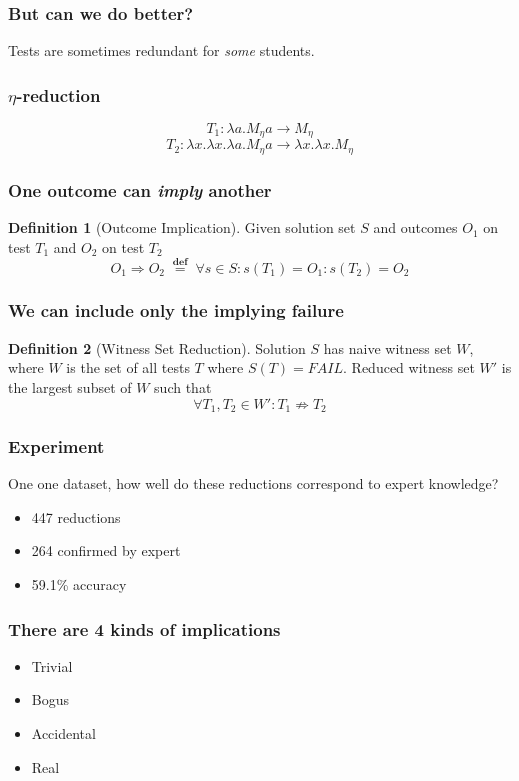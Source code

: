 \documentclass[svgnames,14pt]{beamer}
\newcommand\fail{\mathit{FAIL}}
\newcommand\defined{\mathrel{\;\stackrel{\scriptscriptstyle\mathbf{def}}{=}\;}}
\theoremstyle{definition}
\newtheorem{defn}{Definition}
\begin{document}
\begin{frame}
\frametitle{But can we do better?}
Tests are sometimes redundant for \emph{some} students.
\end{frame}

\begin{frame}
\frametitle{$\eta$-reduction}
$$T_1 : \lambda a.M_\eta a \longrightarrow M_\eta$$
$$T_2 : \lambda x.\lambda x.\lambda a.M_\eta a \longrightarrow \lambda x.\lambda x.M_\eta$$
\end{frame}

\begin{frame}
\frametitle{One outcome can \emph{imply} another}
\begin{defn}[Outcome Implication]
Given solution set $S$ and outcomes $O_1$ on test $T_1$ and $O_2$ on test $T_2$
$$O_1 \Rightarrow O_2 \defined \forall s \in S : s(T_1) = O_1 : s(T_2) = O_2$$
\end{defn}
\end{frame}

\begin{frame}
\frametitle{We can include only the implying failure}
\begin{defn}[Witness Set Reduction]
Solution $S$ has naive witness set $W$, where $W$ is the set of all tests $T$ where $S(T) = \fail$.
Reduced witness set $W'$ is the largest subset of $W$ such that
$$\forall T_1, T_2 \in W' : T_1 \not\Rightarrow T_2$$
\end{defn}
\end{frame}

\begin{frame}
\frametitle{Experiment}
One one dataset, how well do these reductions correspond to expert knowledge?
\end{frame}

\begin{frame}
\begin{itemize}
\item 447 reductions
\item 264 confirmed by expert
\item 59.1\% accuracy
\end{itemize}
\end{frame}

\begin{frame}
\frametitle{There are 4 kinds of implications}
\begin{itemize}
\item Trivial
\item Bogus
\item Accidental
\item Real
\end{itemize}
\end{frame}
\end{document}
